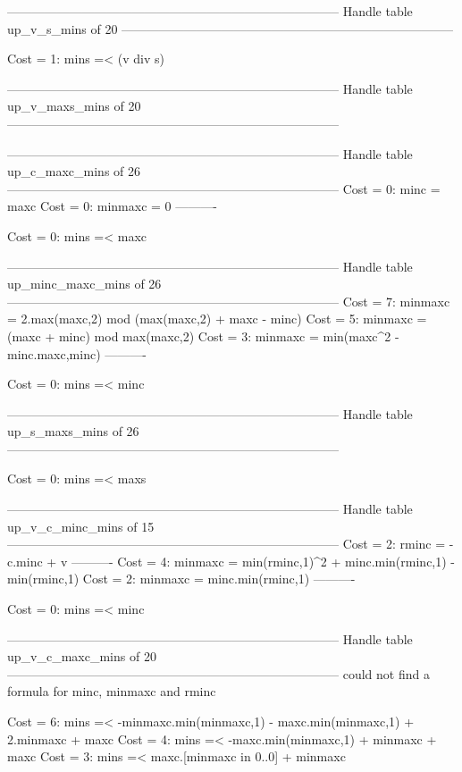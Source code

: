 --------------------------------------------------------------------------------
Handle table up_v_s_mins of 20
--------------------------------------------------------------------------------

Cost =  1:  mins =< (v div s)

--------------------------------------------------------------------------------
Handle table up_v_maxs_mins of 20
--------------------------------------------------------------------------------


--------------------------------------------------------------------------------
Handle table up_c_maxc_mins of 26
--------------------------------------------------------------------------------
Cost =  0:  minc    = maxc
Cost =  0:  minmaxc = 0
----------

Cost =  0:  mins =< maxc

--------------------------------------------------------------------------------
Handle table up_minc_maxc_mins of 26
--------------------------------------------------------------------------------
Cost =  7:  minmaxc = 2.max(maxc,2) mod (max(maxc,2) + maxc - minc)
Cost =  5:  minmaxc = (maxc + minc) mod max(maxc,2)
Cost =  3:  minmaxc = min(maxc^2 - minc.maxc,minc)
----------

Cost =  0:  mins =< minc

--------------------------------------------------------------------------------
Handle table up_s_maxs_mins of 26
--------------------------------------------------------------------------------

Cost =  0:  mins =< maxs

--------------------------------------------------------------------------------
Handle table up_v_c_minc_mins of 15
--------------------------------------------------------------------------------
Cost =  2:  rminc   = -c.minc + v
----------
Cost =  4:  minmaxc = min(rminc,1)^2 + minc.min(rminc,1) - min(rminc,1)
Cost =  2:  minmaxc = minc.min(rminc,1)
----------

Cost =  0:  mins =< minc

--------------------------------------------------------------------------------
Handle table up_v_c_maxc_mins of 20
--------------------------------------------------------------------------------
could not find a formula for minc, minmaxc and rminc

Cost =  6:  mins =< -minmaxc.min(minmaxc,1) - maxc.min(minmaxc,1) + 2.minmaxc + maxc
Cost =  4:  mins =< -maxc.min(minmaxc,1) + minmaxc + maxc
Cost =  3:  mins =< maxc.[minmaxc in 0..0] + minmaxc

